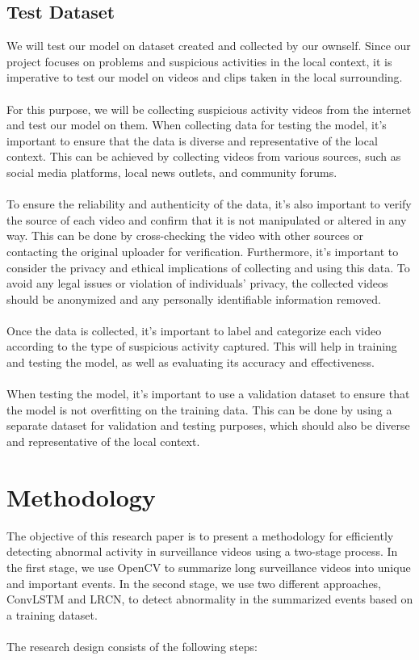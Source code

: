 \documentclass[title page]{article}
\begin{document}
\subsection{Test Dataset}
We will test our model on dataset created and collected by our ownself. Since our project focuses on problems and suspicious activities in the local context, it is imperative to test our model on videos and clips taken in the local surrounding. 
\\ \\
For this purpose, we will be collecting suspicious activity videos from the internet and test our model on them. When collecting data for testing the model, it's important to ensure that the data is diverse and representative of the local context. This can be achieved by collecting videos from various sources, such as social media platforms, local news outlets, and community forums.
\\ \\
To ensure the reliability and authenticity of the data, it's also important to verify the source of each video and confirm that it is not manipulated or altered in any way. This can be done by cross-checking the video with other sources or contacting the original uploader for verification. Furthermore, it's important to consider the privacy and ethical implications of collecting and using this data. To avoid any legal issues or violation of individuals' privacy, the collected videos should be anonymized and any personally identifiable information removed.
\\ \\
Once the data is collected, it's important to label and categorize each video according to the type of suspicious activity captured. This will help in training and testing the model, as well as evaluating its accuracy and effectiveness.
\\ \\
When testing the model, it's important to use a validation dataset to ensure that the model is not overfitting on the training data. This can be done by using a separate dataset for validation and testing purposes, which should also be diverse and representative of the local context.

\section{Methodology}

The objective of this research paper is to present a methodology for efficiently detecting abnormal activity in surveillance videos using a two-stage process. In the first stage, we use OpenCV to summarize long surveillance videos into unique and important events. In the second stage, we use two different approaches, ConvLSTM and LRCN, to detect abnormality in the summarized events based on a training dataset.
\\ \\
The research design consists of the following steps:
\end{document}
